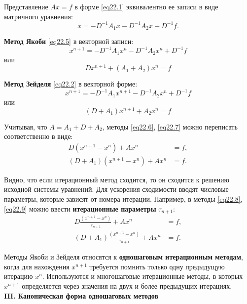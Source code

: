 Представление $Ax=f$ в форме \eqref{eq22.1} эквивалентно ее записи в виде матричного уравнения: 
$$x=-D^{-1}A_{1}x-D^{-1}A_{2}x+D^{-1}f.$$
\par \textbf{Метод Якоби} \eqref{eq22.5} в векторной записи: 
\begin{equation*}
   x^{n+1}=-D^{-1}A_{1}x^{n}-D^{-1}A_{2}x^{n}+D^{-1}f 
\end{equation*}
или 
\begin{equation} \label{eq22.6}
    Dx^{n+1}+\left( A_{1}+A_{2}\right)x^{n}=f
\end{equation}
\par \textbf{Метод Зейделя }\eqref{eq22.2} в векторной форме: 
\begin{equation*}
    x^{n+1}=-D^{-1}A_{1}x^{n+1}-D^{-1}A_{2}x^{n}+D^{-1}f
\end{equation*} 
или 
\begin{equation}\label{eq22.7}
    \left( D+A_{1}\right)x^{n+1}+A_{2}x^{n}=f
\end{equation}
\par Учитывая, что $A = A_1 + D + A_2$, методы \eqref{eq22.6}, \eqref{eq22.7} можно переписать соответственно в виде: 
\begin{align}
\label{eq22.8}
D\left( x^{n+1}-x^{n}\right)+Ax^n &= f,\\
\label{eq22.9}
\left( D+A_{1}\right)\left( x^{n+1}-x^{n}\right)+Ax^n&=f. 
\end{align}
\par Видно, что если итерационный метод сходится, то он сходится к решению исходной системы уравнений. Для ускорения сходимости вводят числовые параметры, которые зависят от номера итерации. Например, в методы \eqref{eq22.8}, \eqref{eq22.9} можно ввести \textbf{итерационные параметры} $\tau_{n+1}$:
\begin{align*}
    D\frac{\left( x^{n+1}-x^{n}\right)}{\tau _{n+1}}+Ax^{n}&=f,\\
    \left( D+A_{1}\right)\frac{\left( x^{n+1}-x^{n}\right)}{\tau _{n+1}}+Ax^{n}&=f.
\end{align*}
\par Методы Якоби и Зейделя относятся к \textbf{одношаговым итерационным методам}, когда для нахождения $x^{n+1}$ требуется помнить только одну предыдущую итерацию $x^{n}$. Используются и многошаговые итерационные методы, в которых $x^{n+1}$ определяется через значения на двух и более предыдущих итерациях.\\

\textbf{III. Каноническая форма одношаговых методов}

